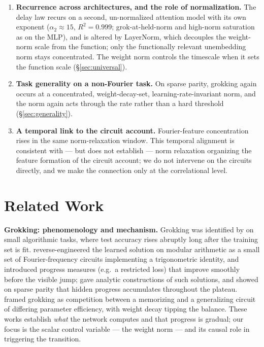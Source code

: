 \documentclass[10pt,twocolumn]{article}
\begin{document}
\begin{enumerate}[leftmargin=*, itemsep=1pt, topsep=2pt]
  norm-freeze causal test, confirming the norm as the operative variable (we do not claim a quantitative
  match of the exponent to a closed-form prediction).
\item \textbf{Recurrence across architectures, and the role of normalization.}
  The delay law recurs on a second, un-normalized attention model with its own exponent
  ($\alpha_2\approx15$, $R^2=0.999$; grok-at-held-norm and high-norm saturation as on the MLP), and is
  altered by LayerNorm, which
  decouples the weight-norm scale from the function; only the functionally relevant unembedding norm stays
  concentrated. The weight norm controls the timescale when it sets the function scale (\S\ref{sec:universal}).
\item \textbf{Task generality on a non-Fourier task.}
  On sparse parity, grokking again occurs at a concentrated, weight-decay-set, learning-rate-invariant norm,
  and the norm again acts through the rate rather than a hard threshold (\S\ref{sec:generality}).
\item \textbf{A temporal link to the circuit account.}
  Fourier-feature concentration rises in the same norm-relaxation window. This temporal alignment is
  consistent with --- but does not establish --- norm relaxation organizing the feature formation of the
  circuit account; we do not intervene on the circuits directly, and we make the connection only at the
  correlational level.
\end{enumerate}

\section{Related Work}

\textbf{Grokking: phenomenology and mechanism.}
Grokking was identified by \citet{power2022grokking} on small algorithmic tasks, where test accuracy rises
abruptly long after the training set is fit. \citet{nanda2023progress} reverse-engineered the learned
solution on modular arithmetic as a small set of Fourier-frequency circuits implementing a trigonometric
identity, and introduced progress measures (e.g.\ a restricted loss) that improve smoothly before the
visible jump; \citet{gromov2023grokking} gave analytic constructions of such solutions, and
\citet{barak2022hidden} showed on sparse parity that hidden progress accumulates throughout the plateau.
\citet{varma2023circuit} framed grokking as competition between a memorizing and a generalizing circuit of
differing parameter efficiency, with weight decay tipping the balance. These works establish \emph{what}
the network computes and that progress is gradual; our focus is the scalar control variable --- the weight
norm --- and its causal role in triggering the transition.
\end{document}
